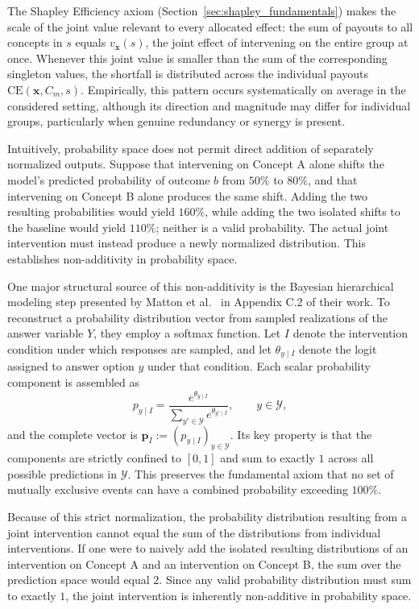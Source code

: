 The Shapley Efficiency axiom (Section~\ref{sec:shapley_fundamentals}) makes the scale of the joint value relevant to every allocated effect: the sum of payouts to all concepts in $s$ equals $v_{\mathbf{x}}(s)$, the joint effect of intervening on the entire group at once. Whenever this joint value is smaller than the sum of the corresponding singleton values, the shortfall is distributed across the individual payouts $\mathrm{CE}(\mathbf{x},C_m,s)$. Empirically, this pattern occurs systematically on average in the considered setting, although its direction and magnitude may differ for individual groups, particularly when genuine redundancy or synergy is present.

Intuitively, probability space does not permit direct addition of separately normalized outputs. Suppose that intervening on Concept A alone shifts the model's predicted probability of outcome $b$ from $50\%$ to $80\%$, and that intervening on Concept B alone produces the same shift. Adding the two resulting probabilities would yield $160\%$, while adding the two isolated shifts to the baseline would yield $110\%$; neither is a valid probability. The actual joint intervention must instead produce a newly normalized distribution. This establishes non-additivity in probability space.

One major structural source of this non-additivity is the Bayesian hierarchical modeling step presented by Matton et al.~\cite{mattonWalkTalkMeasuring2024} in Appendix C.2 of their work. To reconstruct a probability distribution vector from sampled realizations of the answer variable $Y$, they employ a softmax function. Let $I$ denote the intervention condition under which responses are sampled, and let $\theta_{y\mid I}$ denote the logit assigned to answer option $y$ under that condition. Each scalar probability component is assembled as
\begin{equation}\label{eq:culprit_softmax}
	p_{y\mid I} = \frac{e^{\theta_{y\mid I}}}{\sum_{y' \in \mathcal{Y}} e^{\theta_{y'\mid I}}}, \qquad y \in \mathcal{Y},
\end{equation}
and the complete vector is $\mathbf{p}_{I}:=(p_{y\mid I})_{y\in\mathcal{Y}}$. Its key property is that the components are strictly confined to $[0,1]$ and sum to exactly $1$ across all possible predictions in $\mathcal{Y}$. This preserves the fundamental axiom that no set of mutually exclusive events can have a combined probability exceeding $100\%$.

Because of this strict normalization, the probability distribution resulting from a joint intervention cannot equal the sum of the distributions from individual interventions. If one were to naively add the isolated resulting distributions of an intervention on Concept A and an intervention on Concept B, the sum over the prediction space would equal $2$. Since any valid probability distribution must sum to exactly $1$, the joint intervention is inherently non-additive in probability space.

